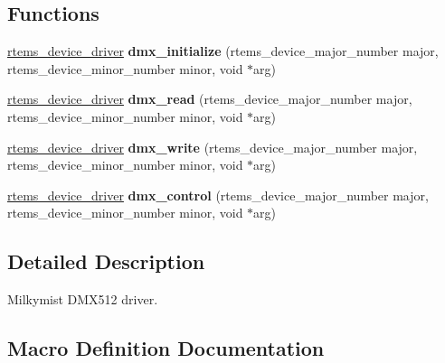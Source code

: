 \subsection*{Functions}
\begin{DoxyCompactItemize}
\item 
\mbox{\label{group__lm32__milkymist__dmx_ga870f5a4507ffdb276c5bfa7c93700d18}} 
\mbox{\hyperlink{group__ClassicStatus_ga545d41846817eaba6143d52ee4d9e9fe}{rtems\+\_\+device\+\_\+driver}} {\bfseries dmx\+\_\+initialize} (rtems\+\_\+device\+\_\+major\+\_\+number major, rtems\+\_\+device\+\_\+minor\+\_\+number minor, void $\ast$arg)
\item 
\mbox{\label{group__lm32__milkymist__dmx_ga9950523a950d512df2c372d6c31e169a}} 
\mbox{\hyperlink{group__ClassicStatus_ga545d41846817eaba6143d52ee4d9e9fe}{rtems\+\_\+device\+\_\+driver}} {\bfseries dmx\+\_\+read} (rtems\+\_\+device\+\_\+major\+\_\+number major, rtems\+\_\+device\+\_\+minor\+\_\+number minor, void $\ast$arg)
\item 
\mbox{\label{group__lm32__milkymist__dmx_gae4221038787821646912b9de1124ec36}} 
\mbox{\hyperlink{group__ClassicStatus_ga545d41846817eaba6143d52ee4d9e9fe}{rtems\+\_\+device\+\_\+driver}} {\bfseries dmx\+\_\+write} (rtems\+\_\+device\+\_\+major\+\_\+number major, rtems\+\_\+device\+\_\+minor\+\_\+number minor, void $\ast$arg)
\item 
\mbox{\label{group__lm32__milkymist__dmx_gab0665c186d4f052cdc494dc082abd9e4}} 
\mbox{\hyperlink{group__ClassicStatus_ga545d41846817eaba6143d52ee4d9e9fe}{rtems\+\_\+device\+\_\+driver}} {\bfseries dmx\+\_\+control} (rtems\+\_\+device\+\_\+major\+\_\+number major, rtems\+\_\+device\+\_\+minor\+\_\+number minor, void $\ast$arg)
\end{DoxyCompactItemize}


\subsection{Detailed Description}
Milkymist D\+M\+X512 driver. 



\subsection{Macro Definition Documentation}
\mbox{\label{group__lm32__milkymist__dmx_ga9b05ec1ec1e680901c86a9341ce867ab}} 
